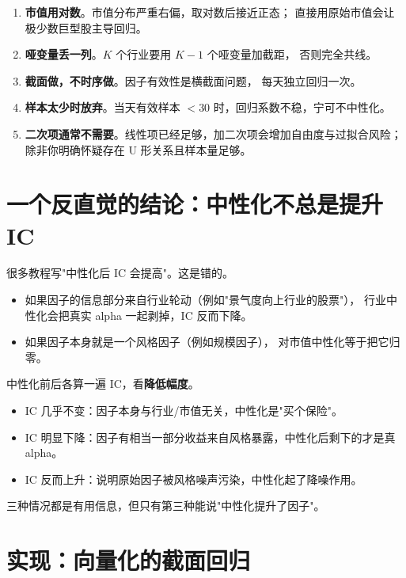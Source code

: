 \begin{enumerate}
  \item \textbf{市值用对数}。市值分布严重右偏，取对数后接近正态；
        直接用原始市值会让极少数巨型股主导回归。
  \item \textbf{哑变量丢一列}。$K$ 个行业要用 $K-1$ 个哑变量加截距，
        否则完全共线。
  \item \textbf{截面做，不时序做}。因子有效性是横截面问题，
        每天独立回归一次。
  \item \textbf{样本太少时放弃}。当天有效样本 $<30$ 时，回归系数不稳，宁可不中性化。
  \item \textbf{二次项通常不需要}。线性项已经足够，加二次项会增加自由度与过拟合风险；
        除非你明确怀疑存在 U 形关系且样本量足够。
\end{enumerate}

\section{一个反直觉的结论：中性化不总是提升 IC}

很多教程写"中性化后 IC 会提高"。这是错的。

\begin{itemize}
  \item 如果因子的信息部分来自行业轮动（例如"景气度向上行业的股票"），
        行业中性化会把真实 alpha 一起剥掉，IC 反而下降。
  \item 如果因子本身就是一个风格因子（例如规模因子），
        对市值中性化等于把它归零。
\end{itemize}

\begin{warnbox}[正确的判断方式]
中性化前后各算一遍 IC，看\textbf{降低幅度}。
\begin{itemize}
  \item IC 几乎不变：因子本身与行业/市值无关，中性化是"买个保险"。
  \item IC 明显下降：因子有相当一部分收益来自风格暴露，中性化后剩下的才是真 alpha。
  \item IC 反而上升：说明原始因子被风格噪声污染，中性化起了降噪作用。
\end{itemize}
三种情况都是有用信息，但只有第三种能说"中性化提升了因子"。
\end{warnbox}

\section{实现：向量化的截面回归}


